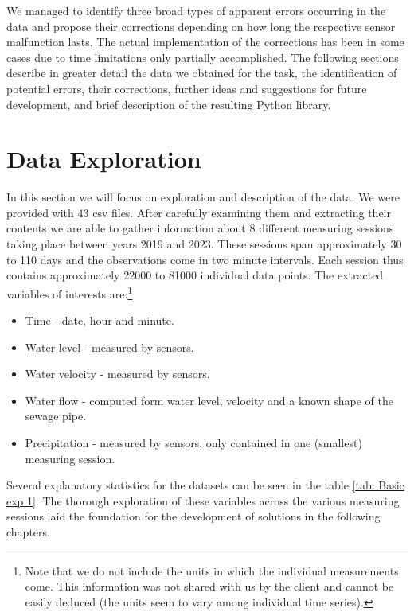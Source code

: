 \documentclass[12pt,a4paper]{article}
\begin{document}
We managed to identify three broad types of apparent errors occurring in the data and propose their corrections depending on how long the respective sensor malfunction lasts. The actual implementation of the corrections has been in some cases  due to time limitations only partially accomplished. The following sections describe in greater detail the data we obtained for the task, the identification of potential errors, their corrections, further ideas and suggestions for future development, and brief description of the resulting Python library. 


\section{Data Exploration}
In this section we will focus on exploration and description of the data. We were provided with 43 csv files. After carefully examining them and extracting their contents we are able to gather information about 8 different measuring sessions taking place between years 2019 and 2023. These sessions span approximately 30 to 110 days and the observations come in two minute intervals. Each session thus contains approximately 22000 to 81000 individual data points. The extracted variables of interests are:\footnote{Note that we do not include the units in which the individual measurements come. This information was not shared with us by the client and cannot be easily deduced (the units seem to vary among individual time series).}
\begin{itemize}
    \item Time - date, hour and minute.
    \item Water level - measured by sensors.
    \item Water velocity - measured by sensors.
    \item Water flow - computed form water level, velocity and a known shape of the sewage pipe.
    \item Precipitation - measured by sensors, only contained in one (smallest) measuring session.
\end{itemize}
Several explanatory statistics for the datasets can be seen in the table \ref{tab: Basic exp 1}. The thorough exploration of these variables across the various measuring sessions laid the foundation for the development of solutions in the following chapters.
\end{document}
